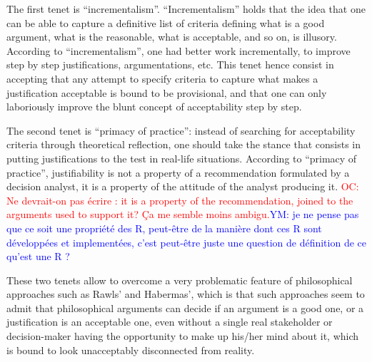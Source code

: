 \documentclass[preprint, french, english, 11pt, authoryear]{elsarticle}%
\newcommand{\commentYM}[1]{\textcolor{blue}{YM: #1}}
\newcommand{\commentOC}[1]{\textcolor{red}{OC: #1}}
\begin{document}
The first tenet is ``incrementalism''. ``Incrementalism'' holds that the idea that one can be able to capture a definitive list of criteria defining what is a good argument, what is the reasonable, what is acceptable, and so on, is illusory. According to ``incrementalism'', one had better work incrementally, to improve step by step justifications, argumentations, etc. This tenet hence consist in accepting that any attempt to specify criteria to capture what makes a justification acceptable is bound to be provisional, and that one can only laboriously improve the blunt concept of acceptability step by step.

The second tenet is ``primacy of practice'': instead of searching for acceptability criteria through theoretical reflection, one should take the stance that consists in putting justifications to the test in real-life situations. According to ``primacy of practice'', justifiability is not a property of a recommendation formulated by a decision analyst, it is a property of the attitude of the analyst producing it.
\commentOC{Ne devrait-on pas écrire : it is a property of the recommendation, joined to the arguments used to support it? Ça me semble moins ambigu.}\commentYM{je ne pense pas que ce soit une propriété des R, peut-être de la manière dont ces R sont développées et implementées, c'est peut-être juste une question de définition de ce qu'est une R ?}

These two tenets allow to overcome a very problematic feature of philosophical approaches such as Rawls' and Habermas', which is that such approaches seem to admit that philosophical arguments can decide if an argument is a good one, or a justification is an acceptable one, even without a single real stakeholder or decision-maker having the opportunity to make up his/her mind about it, which is bound to look unacceptably disconnected from reality.
\end{document}
